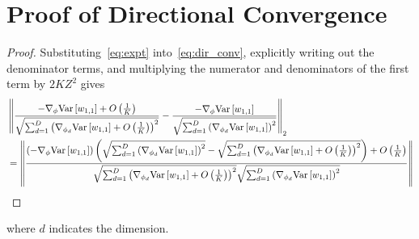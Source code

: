 
\section{Proof of Directional Convergence}
\label{sec:dirproof}

\dirproof*

\begin{proof}
Substituting~\eqref{eq:expt} into~\eqref{eq:dir_conv}, explicitly writing out
the denominator terms, and multiplying the numerator and denominators of the
first term by $2KZ^2$ gives
\begin{align*}
&\left\lVert \frac{-\nabla_{\phi} \text{Var}\left[w_{1,1}\right]
	+O\left(\frac{1}{K}\right)}
{\sqrt{\sum_{d=1}^{D} \left( \nabla_{\phi_d} \text{Var}\left[w_{1,1}\right]
	+O\left(\frac{1}{K}\right)\right)^2}}
-\frac{-\nabla_{\phi} \textnormal{Var}\left[w_{1,1}\right]}
{\sqrt{\sum_{d=1}^D \left(\nabla_{\phi_d} \textnormal{Var}\left[w_{1,1}\right]\right)^2}}
\right\rVert_2 \\
& 
= \left\lVert
\frac{
\left(-\nabla_{\phi} \text{Var}\left[w_{1,1}\right]\right)
\left(
\sqrt{\sum_{d=1}^D \left(\nabla_{\phi_d} \textnormal{Var}\left[w_{1,1}\right]\right)^2}
-\sqrt{\sum_{d=1}^{D} \left( \nabla_{\phi_d} \text{Var}\left[w_{1,1}\right]
	+O\left(\frac{1}{K}\right)\right)^2}\right)+O\left(\frac{1}{K}\right)
}
{
\sqrt{\sum_{d=1}^{D} \left( \nabla_{\phi_d} \text{Var}\left[w_{1,1}\right]
	+O\left(\frac{1}{K}\right)\right)^2}
\sqrt{\sum_{d=1}^D \left(\nabla_{\phi_d} \textnormal{Var}\left[w_{1,1}\right]\right)^2}	
}
\right\rVert
\end{align*}
\end{proof}
where $d$ indicates the dimension.